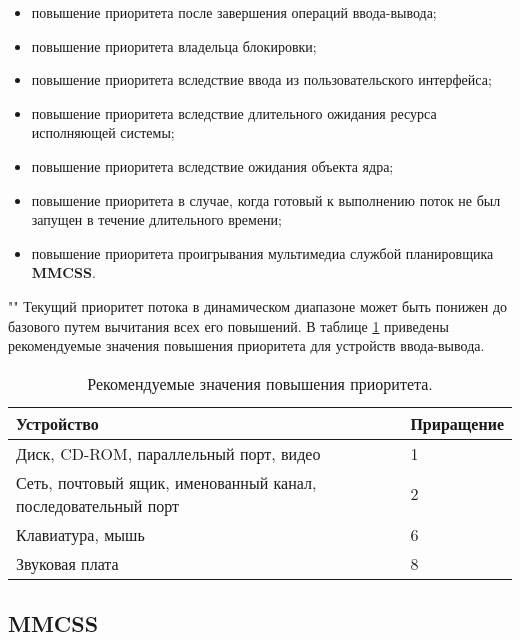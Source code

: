 \begin{itemize}
    \item повышение приоритета после завершения операций ввода-вывода;
    \item повышение приоритета владельца блокировки;
    \item повышение приоритета вследствие ввода из пользовательского интерфейса;
    \item повышение приоритета вследствие длительного ожидания ресурса исполняющей системы;
    \item повышение приоритета вследствие ожидания объекта ядра;
    \item повышение приоритета в случае, когда готовый к выполнению поток не был запущен в течение длительного времени;
    \item повышение приоритета проигрывания мультимедиа службой планировщика \textbf{MMCSS}.
\end{itemize}

""\newline 
\noindent Текущий приоритет потока в динамическом диапазоне может быть понижен до базового путем вычитания всех его повышений. В таблице \ref{tab:io} приведены рекомендуемые значения повышения приоритета для устройств ввода-вывода.

\begin{table}[h]
    \caption{Рекомендуемые значения повышения приоритета.}
    \begin{center}
        \begin{tabular}{|p{100mm}|l|}
            \hline
            \textbf{Устройство} & \textbf{Приращение} \\
            \hline
            Диск, CD-ROM, параллельный порт, видео & 1 \\
            \hline
            Сеть, почтовый ящик, именованный канал, последовательный порт & 2 \\
            \hline
            Клавиатура, мышь & 6 \\
            \hline
            Звуковая плата & 8 \\
            \hline
        \end{tabular}
    \end{center}
    \label{tab:io}
\end{table}

\subsection{MMCSS}

